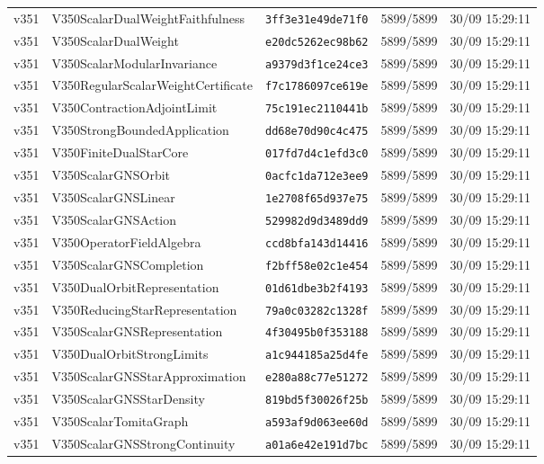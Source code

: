 \documentclass[11pt]{article}
\theoremstyle{definition}\newtheorem{deriv}{Derivação}
\begin{document}
{\begin{longtable}{@{}lllll@{}}
v351 & V350ScalarDualWeightFaithfulness & \texttt{3ff3e31e49de71f0} & 5899/5899 & 30/09 15:29:11 \\
v351 & V350ScalarDualWeight & \texttt{e20dc5262ec98b62} & 5899/5899 & 30/09 15:29:11 \\
v351 & V350ScalarModularInvariance & \texttt{a9379d3f1ce24ce3} & 5899/5899 & 30/09 15:29:11 \\
v351 & V350RegularScalarWeightCertificate & \texttt{f7c1786097ce619e} & 5899/5899 & 30/09 15:29:11 \\
v351 & V350ContractionAdjointLimit & \texttt{75c191ec2110441b} & 5899/5899 & 30/09 15:29:11 \\
v351 & V350StrongBoundedApplication & \texttt{dd68e70d90c4c475} & 5899/5899 & 30/09 15:29:11 \\
v351 & V350FiniteDualStarCore & \texttt{017fd7d4c1efd3c0} & 5899/5899 & 30/09 15:29:11 \\
v351 & V350ScalarGNSOrbit & \texttt{0acfc1da712e3ee9} & 5899/5899 & 30/09 15:29:11 \\
v351 & V350ScalarGNSLinear & \texttt{1e2708f65d937e75} & 5899/5899 & 30/09 15:29:11 \\
v351 & V350ScalarGNSAction & \texttt{529982d9d3489dd9} & 5899/5899 & 30/09 15:29:11 \\
v351 & V350OperatorFieldAlgebra & \texttt{ccd8bfa143d14416} & 5899/5899 & 30/09 15:29:11 \\
v351 & V350ScalarGNSCompletion & \texttt{f2bff58e02c1e454} & 5899/5899 & 30/09 15:29:11 \\
v351 & V350DualOrbitRepresentation & \texttt{01d61dbe3b2f4193} & 5899/5899 & 30/09 15:29:11 \\
v351 & V350ReducingStarRepresentation & \texttt{79a0c03282c1328f} & 5899/5899 & 30/09 15:29:11 \\
v351 & V350ScalarGNSRepresentation & \texttt{4f30495b0f353188} & 5899/5899 & 30/09 15:29:11 \\
v351 & V350DualOrbitStrongLimits & \texttt{a1c944185a25d4fe} & 5899/5899 & 30/09 15:29:11 \\
v351 & V350ScalarGNSStarApproximation & \texttt{e280a88c77e51272} & 5899/5899 & 30/09 15:29:11 \\
v351 & V350ScalarGNSStarDensity & \texttt{819bd5f30026f25b} & 5899/5899 & 30/09 15:29:11 \\
v351 & V350ScalarTomitaGraph & \texttt{a593af9d063ee60d} & 5899/5899 & 30/09 15:29:11 \\
v351 & V350ScalarGNSStrongContinuity & \texttt{a01a6e42e191d7bc} & 5899/5899 & 30/09 15:29:11 \\

\end{longtable}}
\end{document}
